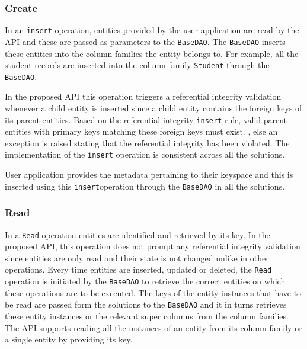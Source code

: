  	 
	
		\subsubsection{Create}
		In an \texttt{insert} operation, entities provided by the
		user application are read by the \ac{API} and these are passed as parameters to the
		\texttt{BaseDAO}.  The \texttt{BaseDAO} inserts these entities into the column
		families the entity belongs to.  For example, all the student records are
		inserted into the column family \texttt{Student} through the \texttt{BaseDAO}. 
		
		In the proposed \ac{API} this operation triggers a referential integrity
		validation whenever a child entity is  inserted since a child entity contains
		the foreign keys of its parent entities.  Based on the referential integrity
		\texttt{insert} rule,  valid parent entities with primary keys matching these
		foreign keys must exist. , else  an exception is raised stating that the
		referential integrity has been violated.  
		The implementation of the \texttt{insert} operation is consistent across all
		the solutions. 
		
		
		User application provides the metadata pertaining to their keyspace and this is
		inserted using this \texttt{insert}operation through the \texttt{BaseDAO} in
		all the solutions. 
		
		\subsubsection{Read}
		In a \texttt{Read} operation  entities are identified and retrieved by its
		key. 
		In the proposed \ac{API}, this operation does not prompt any referential integrity
		validation since entities are only read and their state is not changed 
		 unlike in other operations. 
		Every time entities are inserted, updated or deleted, the \texttt{Read} operation is
		initiated by the \texttt{BaseDAO} to retrieve the correct entities on which
		these operations are to be executed. 
		The keys of the entity instances that have to be read are passed form the
		solutions to the \texttt{BaseDAO} and it in turns retrieves these entity
		instances or the relevant super columns from the column families.  The
		\ac{API} supports reading  all the instances of an entity from its column family or a
		single entity by providing its key. 
		
